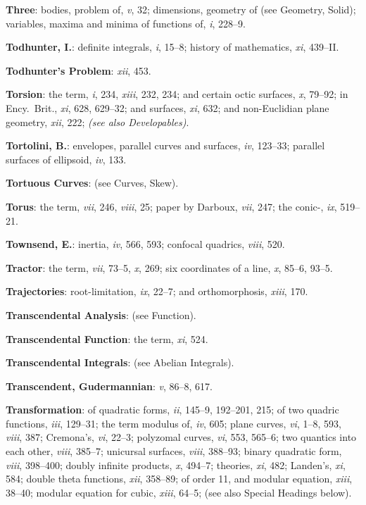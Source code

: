 \documentclass[11pt,a4paper]{article}
\newcommand{\IndexEntry}[1]{\textbf{#1}}
\newcommand{\SeeAlso}[1]{\textit{(see also #1)}}
\newcommand{\V}[1]{\textit{#1}} %
\begin{document}
\IndexEntry{Three}: bodies, problem of, \V{v}, 32; dimensions, geometry of (see Geometry, Solid); variables, maxima and minima of functions of, \V{i}, 228--9.

\IndexEntry{Todhunter, I.}: definite integrals, \V{i}, 15--8; history of mathematics, \V{xi}, 439--II.

\IndexEntry{Todhunter's Problem}: \V{xii}, 453.

\IndexEntry{Torsion}: the term, \V{i}, 234, \V{xiii}, 232, 234; and certain octic surfaces, \V{x}, 79--92; in Ency.\ Brit., \V{xi}, 628, 629--32; and surfaces, \V{xi}, 632; and non-Euclidian plane geometry, \V{xii}, 222; \SeeAlso{Developables}.

\IndexEntry{Tortolini, B.}: envelopes, parallel curves and surfaces, \V{iv}, 123--33; parallel surfaces of ellipsoid, \V{iv}, 133.

\IndexEntry{Tortuous Curves}: (see Curves, Skew).

\IndexEntry{Torus}: the term, \V{vii}, 246, \V{viii}, 25; paper by Darboux, \V{vii}, 247; the conic-, \V{ix}, 519--21.

\IndexEntry{Townsend, E.}: inertia, \V{iv}, 566, 593; confocal quadrics, \V{viii}, 520.

\newpage

\setcounter{page}{128}

\IndexEntry{Tractor}: the term, \V{vii}, 73--5, \V{x}, 269; six coordinates of a line, \V{x}, 85--6, 93--5.

\IndexEntry{Trajectories}: root-limitation, \V{ix}, 22--7; and orthomorphosis, \V{xiii}, 170.

\IndexEntry{Transcendental Analysis}: (see Function).

\IndexEntry{Transcendental Function}: the term, \V{xi}, 524.

\IndexEntry{Transcendental Integrals}: (see Abelian Integrals).

\IndexEntry{Transcendent, Gudermannian}: \V{v}, 86--8, 617.

\IndexEntry{Transformation}: of quadratic forms, \V{ii}, 145--9, 192--201, 215; of two quadric functions, \V{iii}, 129--31; the term modulus of, \V{iv}, 605; plane curves, \V{vi}, 1--8, 593, \V{viii}, 387; Cremona's, \V{vi}, 22--3; polyzomal curves, \V{vi}, 553, 565--6; two quantics into each other, \V{viii}, 385--7; unicursal surfaces, \V{viii}, 388--93; binary quadratic form, \V{viii}, 398--400; doubly infinite products, \V{x}, 494--7; theories, \V{xi}, 482; Landen's, \V{xi}, 584; double theta functions, \V{xii}, 358--89; of order 11, and modular equation, \V{xiii}, 38--40; modular equation for cubic, \V{xiii}, 64--5; (see also Special Headings below).
\end{document}
